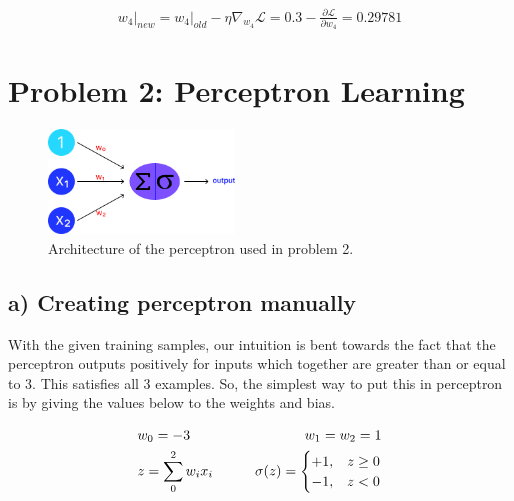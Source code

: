 \documentclass[conference]{IEEEtran}
\begin{document}
\begin{align*}
    \left. w_4\right|_{new} = \left. w_4\right|_{old} - \eta \nabla_{w_4} \mathcal{L} = 0.3 - \frac{\partial \mathcal{L}}{\partial w_4} = \mathbf{0.29781}
\end{align*}
\vspace{21px}

\section{Problem 2: Perceptron Learning}
\begin{figure}[htbp]
    \centerline{\includegraphics[width=0.44\textwidth]{figures/perceptron.png}}
    \caption{Architecture of the perceptron used in problem 2.}
    \label{fig:prob2}
\end{figure}
\subsection*{a) Creating perceptron manually}
With the given training samples, our intuition is bent towards the fact that the perceptron outputs positively for inputs which together are greater than or equal to 3. This satisfies all 3 examples. So, the simplest way to put this in perceptron is by giving the values below to the weights and bias.

\begin{align}
     & w_0 = -3 \hspace{20px}                 & w_1 = w_2 = 1 \nonumber   \\
     & z = \sum_{0}^{2} w_i x_i \hspace{20px} & \sigma(z) = \begin{cases}
                                                                +1, & z \ge 0 \\
                                                                -1, & z < 0
                                                            \end{cases}
\end{align}
\end{document}
